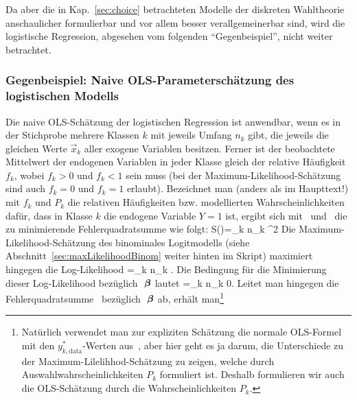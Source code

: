 Da aber die in Kap.~\ref{sec:choice} betrachteten Modelle der
diskreten Wahltheorie anschaulicher formulierbar und vor allem
besser verallgemeinerbar sind, wird die logistische Regression, abgesehen vom
folgenden ``Gegenbeispiel'',
 nicht weiter betrachtet. 







 
\subsubsection{\label{sec:logOLS}Gegenbeispiel: Naive
  OLS-Parametersch\"atzung des logistischen Modells}

\EinsteinBeg
Die naive OLS-Sch\"atzung der logistischen Regression ist
anwendbar, wenn es in der Stichprobe 
mehrere Klassen $k$ mit jeweils Umfang $n_k$ gibt, die jeweils die gleichen
Werte $\vec{x}_k$ aller exogene Variablen besitzen. Ferner ist der
beobachtete Mittelwert der  endogenen Variablen in jeder Klasse
gleich der relative H\"aufigkeit
$f_k$, wobei $f_k>0$ und $f_k<1$ sein muss  (bei der
Maximum-Likelihood-Sch\"atzung sind auch $f_k=0$ und $f_k=1$ erlaubt).
Bezeichnet man (anders als im Haupttext!) mit $f_k$ und $P_k$ die
relativen H\"aufigkeiten bzw. modellierten Wahrscheinlichkeiten
daf\"ur, dass in Klasse $k$ die endogene Variable $Y=1$ ist, ergibt
sich mit~ und~ die zu minimierende Fehlerquadratsumme
wie folgt:
\be
\label{logR:SSE}
S(\vecbeta)=\sum_k n_k ^2
\ee
%
Die Maximum-Likelihood-Sch\"atzung des binominales Logitmodells (siehe
Abschnitt~\ref{sec:maxLikelihoodBinom} weiter hinten im Skript) 
maximiert hingegen die Log-Likelihood
\bdm
{}=\sum_k n_k \left[f_k \ln P_k-(1-f_k)\ln(1-P_k)\right].
\edm
%
Die Bedingung f\"ur die Minimierung dieser Log-Likelihood bez\"uglich
${\mbox{ \boldmath{$\beta$}}}$ lautet  
\be
\label{logR:minLogit}
=\sum_k n_k
 \stackrel{!}{=} 0.
\ee
%
Leitet man hingegen die Fehlerquadratsumme~
bez\"uglich ${\mbox{ \boldmath{$\beta$}}}$ ab, erh\"alt man\footnote{Nat\"urlich verwendet
  man zur expliziten Sch\"atzung die normale
  OLS-Formel~ mit den $y^*_{k,\textrm{data}}$-Werten
  aus~, aber hier geht es ja darum, die Unterschiede zu der
  Maximum-Lilelihhod-Sch\"atzung  zu zeigen, welche 
  durch Auswahlwahrscheinlichkeiten $P_k$ formuliert ist. Deshalb
  formulieren wir auch die OLS-Sch\"atzung durch die
  Wahrscheinlichkeiten $P_k$.}
